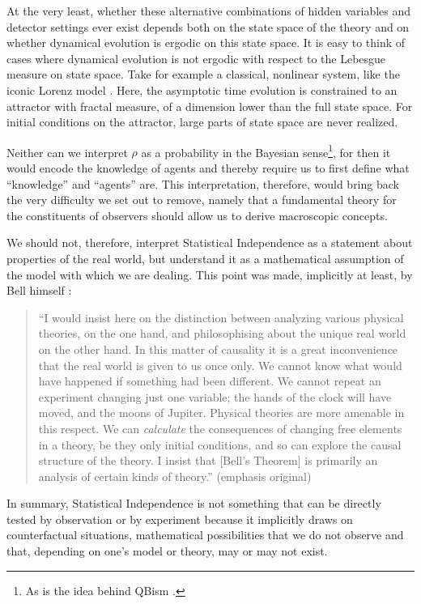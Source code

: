 \documentclass[12pt]{article}
\begin{document}
At the very least, whether these alternative combinations of hidden variables and detector settings ever exist depends both on the state space of the theory and on whether dynamical evolution is ergodic on this state space. It is easy to think of cases where dynamical evolution is not ergodic with respect to the Lebesgue measure on state space. Take for example a classical, nonlinear system, like the iconic Lorenz model \cite{Lorenz}. Here, the asymptotic time evolution is constrained to an attractor with fractal measure, of a dimension lower than the full state space. For initial conditions on the attractor, large parts of state space are never realized.

Neither can we interpret $\rho$ as a probability in the Bayesian sense\footnote{As is the idea behind QBism \cite{qbism}.}, for then it would encode the knowledge of agents and thereby require us to first define what ``knowledge'' and ``agents'' are. This interpretation, therefore, would bring back the very difficulty we set out to remove, namely that a fundamental theory for the constituents of observers should allow us to derive macroscopic concepts.

We should not, therefore, interpret Statistical Independence as a statement about properties of the real world, but understand it as a mathematical assumption of the model with which we are dealing. This point was made, implicitly at least, by Bell himself \cite{Bell}:
\begin{quote}
``I would insist here on the distinction between analyzing various physical theories, on the one hand, and philosophising about the unique real world on the other hand. In this matter of causality it is a great inconvenience that the real world is given to us once only. We cannot know  what would have happened if something had been different. We cannot repeat an experiment changing just one variable; the hands of the clock will have moved, and the moons of Jupiter. Physical theories are more amenable in this respect. We can \emph{calculate} the consequences of changing free elements in a theory, be they only initial conditions, and so can explore the causal structure of the theory. I insist that [Bell's Theorem] is primarily an analysis of certain kinds of theory.'' (emphasis original)
\end{quote}

In summary, Statistical Independence is not something that can be directly tested by observation or by experiment because it implicitly draws on counterfactual situations, mathematical possibilities that we do not observe and that, depending on one's model or theory, may or may not exist. 
\end{document}
